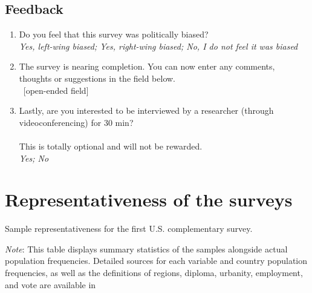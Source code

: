 \subsection*{Feedback}
\begin{enumerate}[resume]
\item Do you feel that this survey was politically biased?
\\ \textit{Yes, left-wing biased; Yes, right-wing biased; No, I do not feel it was biased}
\item The survey is nearing completion. You can now enter any comments, thoughts or suggestions in the field below.
\\ ~[open-ended field]
\item Lastly, are you interested to be interviewed by a researcher (through videoconferencing) for 30 min? \\
\\
This is totally optional and will not be rewarded.
\\ \textit{Yes; No}
\end{enumerate}

\clearpage
\section{Representativeness of the surveys}\label{app:representativeness}

\begin{table}[h]\label{tab:representativeness_US1}
    \caption{Sample representativeness for the first U.S. complementary survey.} 
    \makebox[\textwidth][c]{
        \resizebox*{!}{.7\textheight}{%
        
        }
    }
    {\footnotesize \textit{Note}: This table displays summary statistics of the samples alongside actual population frequencies. %
    Detailed sources for each variable and country population frequencies, as well as the definitions of regions, diploma, urbanity, employment, and vote are available in %
    }
\end{table}